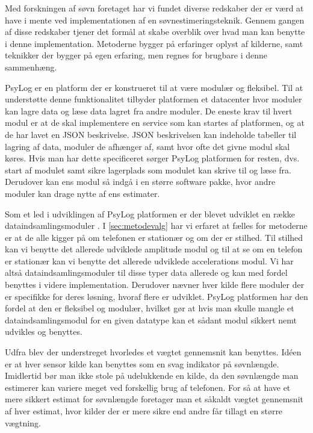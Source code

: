 Med forskningen af søvn foretaget har vi fundet diverse redskaber der er værd at have i mente ved implementationen af en søvnestimeringsteknik.
Gennem gangen af disse redskaber tjener det formål at skabe overblik over hvad man kan benytte i denne implementation.
Metoderne bygger på erfaringer oplyst af kilderne, samt teknikker der bygger på egen erfaring, men regnes for brugbare i denne sammenhæng.

\begin{description}[style=nextline]
\item[PsyLog]
PsyLog er en platform der er konstrueret til at være modulær og fleksibel.
Til at understøtte denne funktionalitet tilbyder platformen et datacenter hvor moduler kan lagre data og læse data lagret fra andre moduler.
De eneste krav til hvert modul er at de skal implementere en service som kan startes af platformen, og at de har lavet en JSON beskrivelse.
JSON beskrivelsen kan indeholde tabeller til lagring af data, moduler de afhænger af, samt hvor ofte det givne modul skal køres.
Hvis man har dette specificeret sørger PsyLog platformen for resten, dvs. start af modulet samt sikre lagerplads som modulet kan skrive til og læse fra.
Derudover kan ens modul så indgå i en større software pakke, hvor andre moduler kan drage nytte af ens estimater.

\item[Dataindsamlingsmoduler]
Som et led i udviklingen af PsyLog platformen er der blevet udviklet en række dataindsamlingsmoduler \citep{misc:faellesrapp}.
I \cref{sec:metodevalg} har vi erfaret at fælles for metoderne er at de alle kigger på om telefonen er stationær og om der er stilhed. 
Til stilhed kan vi benytte det allerede udviklede amplitude modul og til at se om en telefon er stationær kan vi benytte det allerede udviklede accelerations modul.
Vi har altså dataindsamlingsmoduler til disse typer data allerede og kan med fordel benyttes i videre implementation.
Derudover nævner hver kilde flere moduler der er specifikke for deres løsning, hvoraf flere er udviklet.
PsyLog platformen har den fordel at den er fleksibel og modulær, hvilket gør at hvis man skulle mangle et dataindsamlingsmodul for en given datatype kan et sådant modul sikkert nemt udvikles og benyttes.

\item[Vægtet gennemsnit]
Udfra \citet{6563918} blev der understreget hvorledes et vægtet gennemsnit kan benyttes.
Idéen er at hver sensor kilde kan benyttes som en svag indikator på søvnlængde.
Imidlertid bør man ikke stole på udelukkende en kilde, da den søvnlængde man estimerer kan variere meget ved forskellig brug af telefonen.
For så at have et mere sikkert estimat for søvnlængde foretager man et såkaldt vægtet gennemsnit af hver estimat, hvor kilder der er mere sikre end andre får tillagt en større vægtning.


\end{description}
